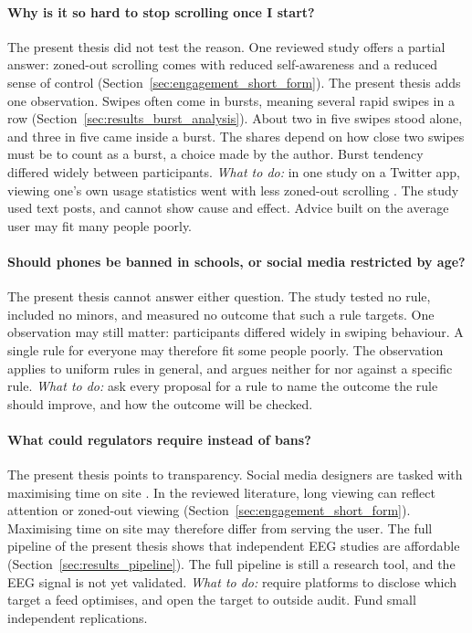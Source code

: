 \documentclass[12pt,a4paper]{report}
\begin{document}
\paragraph{Why is it so hard to stop scrolling once I start?}
The present thesis did not test the reason. One reviewed study offers a partial answer: zoned-out scrolling comes with reduced self-awareness and a reduced sense of control \cite{baughan_i_2022} (Section~\ref{sec:engagement_short_form}). The present thesis adds one observation. Swipes often come in bursts, meaning several rapid swipes in a row (Section~\ref{sec:results_burst_analysis}). About two in five swipes stood alone, and three in five came inside a burst. The shares depend on how close two swipes must be to count as a burst, a choice made by the author. Burst tendency differed widely between participants.
\emph{What to do:} in one study on a Twitter app, viewing one's own usage statistics went with less zoned-out scrolling \cite{baughan_i_2022}. The study used text posts, and cannot show cause and effect. Advice built on the average user may fit many people poorly.

\paragraph{Should phones be banned in schools, or social media restricted by age?}
The present thesis cannot answer either question. The study tested no rule, included no minors, and measured no outcome that such a rule targets. One observation may still matter: participants differed widely in swiping behaviour. A single rule for everyone may therefore fit some people poorly. The observation applies to uniform rules in general, and argues neither for nor against a specific rule.
\emph{What to do:} ask every proposal for a rule to name the outcome the rule should improve, and how the outcome will be checked.

\paragraph{What could regulators require instead of bans?}
The present thesis points to transparency. Social media designers are tasked with maximising time on site \cite{baughan_i_2022}. In the reviewed literature, long viewing can reflect attention or zoned-out viewing (Section~\ref{sec:engagement_short_form}). Maximising time on site may therefore differ from serving the user. The full pipeline of the present thesis shows that independent EEG studies are affordable (Section~\ref{sec:results_pipeline}). The full pipeline is still a research tool, and the EEG signal is not yet validated.
\emph{What to do:} require platforms to disclose which target a feed optimises, and open the target to outside audit. Fund small independent replications.
\end{document}
